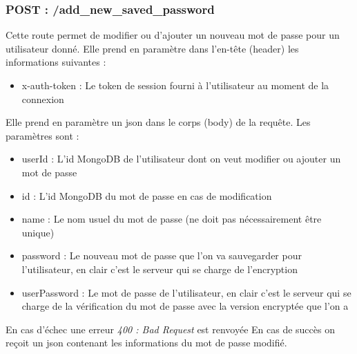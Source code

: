 \documentclass[12pt]{report}
\begin{document}
	\subsubsection{POST : /add\_new\_saved\_password}
	Cette route permet de modifier ou d'ajouter un nouveau mot de passe pour un utilisateur donné.
	\newline
	Elle prend en paramètre dans l'en-tête (header) les informations suivantes :
	\begin{itemize}
		\item x-auth-token : Le token de session fourni à l'utilisateur au moment de la connexion
	\end{itemize}
	Elle prend en paramètre un \gls{json} dans le corps (body) de la requête. Les paramètres sont :
	\begin{itemize}
		\item userId : L'id MongoDB de l'utilisateur dont on veut modifier ou ajouter un mot de passe
		\item id : L'id MongoDB du mot de passe en cas de modification
		\item name : Le nom usuel du mot de passe (ne doit pas nécessairement être unique)
		\item password : Le nouveau mot de passe que l'on va sauvegarder pour l'utilisateur, en clair c'est le serveur qui se charge de l'encryption
		\item userPassword : Le mot de passe de l'utilisateur, en clair c'est le serveur qui se charge de la vérification du mot de passe avec la version encryptée que l'on a
	\end{itemize}
	En cas d'échec une erreur \textit{400 : Bad Request} est renvoyée
	En cas de succès on reçoit un \gls{json} contenant les informations du mot de passe modifié.
\end{document}
